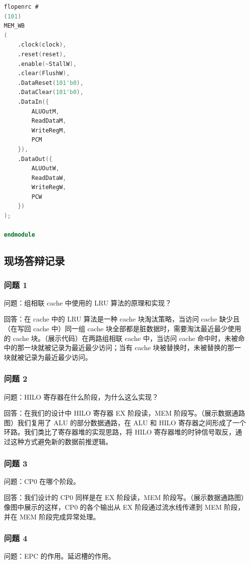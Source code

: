 \begin{lstlisting}[language=Verilog]
flopenrc #
(101)
MEM_WB
(
    .clock(clock),
    .reset(reset),
    .enable(~StallW),
    .clear(FlushW),
    .DataReset(101'b0),
    .DataClear(101'b0),
    .DataIn({
        ALUOutM,
        ReadDataM,
        WriteRegM,
        PCM
    }),
    .DataOut({
        ALUOutW,
        ReadDataW,
        WriteRegW,
        PCW
    })
);

endmodule
\end{lstlisting}


\subsection{现场答辩记录}

\subsubsection{问题 1}

问题：组相联 cache 中使用的 LRU 算法的原理和实现？

回答：在 cache 中的 LRU 算法是一种 cache 块淘汰策略，当访问 cache 缺少且（在写回 cache 中）同一组 cache 块全部都是脏数据时，需要淘汰最近最少使用的 cache 块。（展示代码）在两路组相联 cache 中，当访问 cache 命中时，未被命中的那一块就被记录为最近最少访问；当有 cache 块被替换时，未被替换的那一块就被记录为最近最少访问。

\subsubsection{问题 2}

问题：HILO 寄存器在什么阶段，为什么这么实现？

回答：在我们的设计中 HILO 寄存器 EX 阶段读，MEM 阶段写。（展示数据通路图）我们复用了 ALU 的部分数据通路，在 ALU 和 HILO 寄存器之间形成了一个环路。我们类比了寄存器堆的实现思路，将 HILO 寄存器堆的时钟信号取反，通过这种方式避免新的数据前推逻辑。

\subsubsection{问题 3}
问题：CP0 在哪个阶段。

回答：我们设计的 CP0 同样是在 EX 阶段读，MEM 阶段写。（展示数据通路图）像图中展示的这样，CP0 的各个输出从 EX 阶段通过流水线传递到 MEM 阶段，并在 MEM 阶段完成异常处理。

\subsubsection{问题 4}
问题：EPC 的作用。延迟槽的作用。

